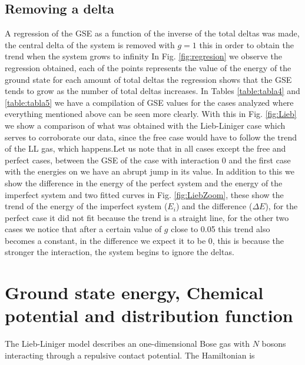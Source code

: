 \documentclass[twocolumn,showpacs,showkeys,preprintnumbers,superscriptaddress, pra, 10pt, aps]{revtex4-2}
\begin{document}
\subsection{Removing a delta}
A regression of the GSE as a function of the inverse of the total deltas was made, the central delta of the system is removed with $g=1$ this in order to obtain the trend when the system grows to infinity In Fig. \ref{fig:regresion} we observe the regression obtained, each of the points represents the value of the energy of the ground state for each amount of total deltas the regression shows that the GSE tends to grow as the number of total deltas increases.
In Tables \ref{table:tabla4} and \ref{table:tabla5} we have a compilation of GSE values for the cases analyzed where everything mentioned above can be seen more clearly. With this in Fig. \ref{fig:Lieb} we show a comparison of what was obtained with the Lieb-Liniger case which serves to corroborate our data, since the free case would have to follow the trend of the LL gas, which happens.Let us note that in all cases except the free and perfect cases, between the GSE of the case with interaction 0 and the first case with the energies on we have an abrupt jump in its value.
In addition to this we show the difference in the energy of the perfect system and the energy of the imperfect system and two fitted curves in Fig. \ref{fig:LiebZoom}, these show the trend of the energy of the imperfect system ($E_i$) and the difference ($\Delta E$), for the perfect case it did not fit because the trend is a straight line, for the other two cases we notice that after a certain value of $g$ close to 0.05 this trend also becomes a constant, in the difference we expect it to be 0, this is because the stronger the interaction, the system begins to ignore the deltas.


\section{Ground state energy, Chemical potential and distribution function}
The Lieb-Liniger model \cite{LL} describes an one-dimensional Bose gas with $N$ bosons interacting through a repulsive contact potential.
The Hamiltonian is
\end{document}
